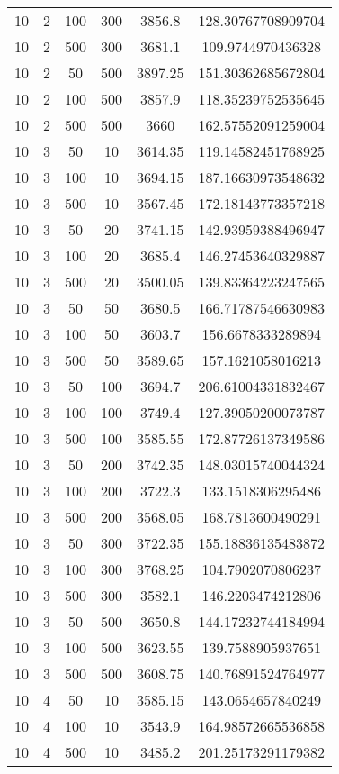 {\begin{longtabu}{S
S
S
S
S[round-mode=places, round-precision=0]
S[round-mode=places, round-precision=0]}
10 & 2 & 100 & 300 & 3856.8 & 128.30767708909704 \\
10 & 2 & 500 & 300 & 3681.1 & 109.9744970436328 \\
10 & 2 & 50 & 500 & 3897.25 & 151.30362685672804 \\
10 & 2 & 100 & 500 & 3857.9 & 118.35239752535645 \\
10 & 2 & 500 & 500 & 3660 & 162.57552091259004 \\
10 & 3 & 50 & 10 & 3614.35 & 119.14582451768925 \\
10 & 3 & 100 & 10 & 3694.15 & 187.16630973548632 \\
10 & 3 & 500 & 10 & 3567.45 & 172.18143773357218 \\
10 & 3 & 50 & 20 & 3741.15 & 142.93959388496947 \\
10 & 3 & 100 & 20 & 3685.4 & 146.27453640329887 \\
10 & 3 & 500 & 20 & 3500.05 & 139.83364223247565 \\
10 & 3 & 50 & 50 & 3680.5 & 166.71787546630983 \\
10 & 3 & 100 & 50 & 3603.7 & 156.6678333289894 \\
10 & 3 & 500 & 50 & 3589.65 & 157.1621058016213 \\
10 & 3 & 50 & 100 & 3694.7 & 206.61004331832467 \\
10 & 3 & 100 & 100 & 3749.4 & 127.39050200073787 \\
10 & 3 & 500 & 100 & 3585.55 & 172.87726137349586 \\
10 & 3 & 50 & 200 & 3742.35 & 148.03015740044324 \\
10 & 3 & 100 & 200 & 3722.3 & 133.1518306295486 \\
10 & 3 & 500 & 200 & 3568.05 & 168.7813600490291 \\
10 & 3 & 50 & 300 & 3722.35 & 155.18836135483872 \\
10 & 3 & 100 & 300 & 3768.25 & 104.7902070806237 \\
10 & 3 & 500 & 300 & 3582.1 & 146.2203474212806 \\
10 & 3 & 50 & 500 & 3650.8 & 144.17232744184994 \\
10 & 3 & 100 & 500 & 3623.55 & 139.7588905937651 \\
10 & 3 & 500 & 500 & 3608.75 & 140.76891524764977 \\
10 & 4 & 50 & 10 & 3585.15 & 143.0654657840249 \\
10 & 4 & 100 & 10 & 3543.9 & 164.98572665536858 \\
10 & 4 & 500 & 10 & 3485.2 & 201.25173291179382 \\

\end{longtabu}}
